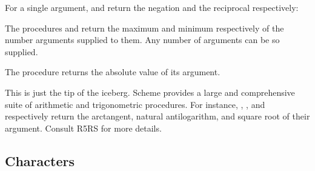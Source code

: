 \n For a single argument, \q{-} and \q{/} return the negation
and the reciprocal respectively:



\n The procedures  and  return the maximum and
minimum respectively of the number arguments supplied to
them.  Any number of arguments can be so supplied.



\n The procedure  returns the absolute value of
its argument.



\n This is just the tip of the iceberg.  Scheme
provides a large and comprehensive suite of arithmetic
and trigonometric procedures.  For instance, ,
, and  respectively return the
arctangent, natural antilogarithm, and 
square root of their argument.  Consult
R5RS \cite{r5rs} for more details.


\subsection{Characters}

